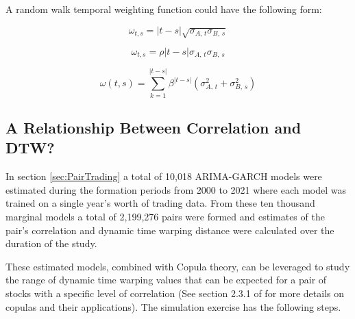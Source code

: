 \documentclass[12pt]{article}
\begin{document}
A random walk temporal weighting function could have the following form:

\begin{equation}
    \omega_{t, s} = \lvert t - s \rvert \sqrt{ \sigma_{A,\, t} \sigma_{B,\, s} }
\end{equation}

\begin{equation}
    \omega_{t, s} = \rho \lvert t - s \rvert \sigma_{A,\, t} \sigma_{B,\, s}
\end{equation}

\begin{equation}
    \omega(t, s) = \sum_{k=1}^{|t-s|} \beta^{|t-s|} \left( \sigma^{2}_{A,\, t} + \sigma^{2}_{B,\,s} \right)
\end{equation}


\subsection{A Relationship Between Correlation and DTW?}

In section \ref{sec:PairTrading} a total of 10,018 ARIMA-GARCH models were estimated during the formation periods from 2000 to 2021 where each model was trained on a single year's worth of trading data. From these ten thousand marginal models a total of 2,199,276 pairs were formed and estimates of the pair's correlation and dynamic time warping distance were calculated over the duration of the study.

These estimated models, combined with Copula theory, can be leveraged to study the range of dynamic time warping values that can be expected for a pair of stocks with a specific level of correlation (See section 2.3.1 of \cite{DowiakTV-COP} for more details on copulas and their applications). The simulation exercise has the following steps.
\end{document}
